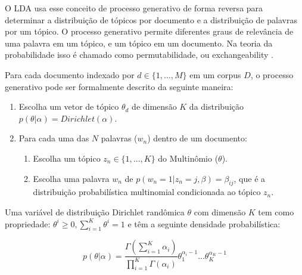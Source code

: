 \documentclass[12pt,a4paper]{article}
\begin{document}
   O LDA usa esse conceito de processo generativo de forma reversa para determinar a distribuição de tópicos por documento e a distribuição de palavras por um tópico. 
   O processo generativo permite diferentes graus de relevância de uma palavra em um tópico, e um tópico em um documento. Na teoria da probabilidade isso é chamado como permutabilidade,
   ou exchangeability \cite{aldous1985exchangeability}. 
   
   Para cada documento indexado por $d \in \{1,. . . , M\}$ em um corpus $D$, o processo generativo pode ser formalmente descrito da seguinte maneira:
  
  
  \begin{enumerate}
    \item Escolha um vetor de tópico $\theta _d$ de dimensão $K$ da distribuição $p(\theta|\alpha)=Dirichlet(\alpha)$.
    \item Para cada uma das $N$ palavras ($w_n$) dentro de um documento:
    \begin{enumerate}
      \item Escolha um tópico \(z_n \in \{1,. . . , K\}\) do Multinômio ($\theta$).
      \item Escolha uma palavra $w_n$ de \(p(w_n=1| z_n=j,\beta)=\beta _{ij}\), que é a distribuição probabilística multinomial condicionada ao tópico $z_n$.
    \end{enumerate}
  \end{enumerate}
  
  
  Uma variável de distribuição Dirichlet randômica $\theta$ com dimensão $K$ tem como propriedade: $\theta ^i \geq 0, \displaystyle\sum_{i=1}^{K} \theta ^i = 1$ e têm a seguinte densidade probabilística:
  
  \begin{equation}
  p(\theta|\alpha) = \frac{\Gamma(\displaystyle\sum_{i=1}^{K} \alpha _i)}{\displaystyle\prod_{i=1}^{K} \Gamma(\alpha _i)} \theta _1 ^{\alpha _i - 1} ...  \theta _K ^{\alpha _K - 1}
  \end{equation}
  
\end{document}
